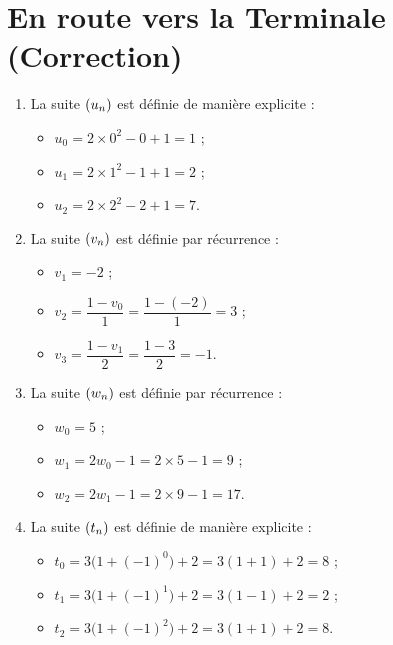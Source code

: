 \documentclass[a4paper,11pt]{article}
\author{Pierquet}
\title{\nomfichier}
\begin{document}
\pagestyle{fancy}

\part*{En route vers la Terminale (Correction)}

\newcommand\htimg{2.1cm}

\smallskip


\begin{enumerate}
	\item La suite $\suiten$ est définie de manière explicite :
	\begin{itemize}
		\item $u_0 = 2\times0^2-0+1=1$ ;
		\item $u_1 = 2\times1^2-1+1=2$ ;
		\item $u_2 = 2\times2^2-2+1=7$.
	\end{itemize}
	\item La suite $\suiten[v]$ est définie par récurrence :
	\begin{itemize}
		\item $v_1=-2$ ;
		\item $v_2 = \dfrac{1-v_0}{1} = \dfrac{1-(-2)}{1}=3$ ;
		\item $v_3 = \dfrac{1-v_1}{2} = \dfrac{1-3}{2}=-1$.
	\end{itemize}
	\item La suite $\suiten[w]$ est définie par récurrence :
	\begin{itemize}
		\item $w_0=5$ ;
		\item $w_1 = 2w_0-1=2\times5-1=9$ ;
		\item $w_2 = 2w_1-1=2\times9-1=17$.
	\end{itemize}
	\item La suite $\suiten[t]$ est définie de manière explicite :
	\begin{itemize}
		\item $t_0=3\big(1+(-1)^0\big)+2=3(1+1)+2=8$ ;
		\item $t_1=3\big(1+(-1)^1\big)+2=3(1-1)+2=2$ ;
		\item $t_2=3\big(1+(-1)^2\big)+2=3(1+1)+2=8$.
	\end{itemize}
\end{enumerate}

\medskip

\end{document}
